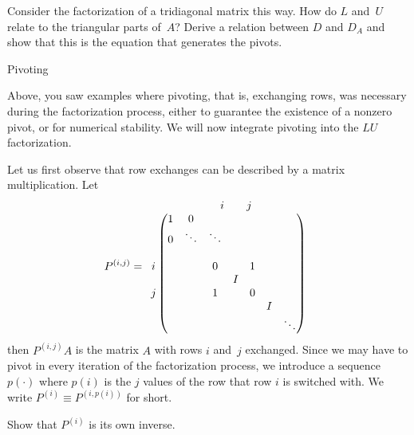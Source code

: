 \begin{exercise}
  Consider the factorization of a tridiagonal matrix this way. How do
  $L$ and~$U$ relate to the triangular parts of~$A$? Derive a relation
  between $D$ and $D_A$ and show that this is the equation that generates
  the pivots.
\end{exercise}

 {Pivoting}
\label{sec:pivoting}

Above, you saw examples where pivoting, that is, exchanging rows, was
necessary during the factorization process, either to guarantee the
existence of a nonzero pivot, or for numerical stability. We will now
integrate pivoting into the $LU$ factorization.

Let us first observe that row exchanges can be described by a matrix
multiplication. Let
\[ P^{(i,j)}=
\begin{array}{cc}
\begin{matrix}\hphantom{i}\end{matrix}
\begin{matrix}&&i&&j&\end{matrix}
\\
\begin{matrix}
  \\ \\ i \\ \\ j\\ \\
\end{matrix}
\begin{pmatrix}
  1&0\\ 0&\ddots&\ddots\\ &\\
  &&0&&1\\ &&&I\\ &&1&&0\\ &&&&&I\\ &&&&&&\ddots
\end{pmatrix}
\end{array}
\]
then $P^{(i,j)}A$ is the matrix $A$ with rows $i$ and~$j$
exchanged. Since we may have to pivot in every iteration of the
factorization process, we introduce a sequence $p(\cdot)$ where $p(i)$
is the $j$ values of the row that row $i$ is switched with. We write
$P^{(i)}\equiv P^{(i,p(i))}$ for short.
\begin{exercise}
  Show that $P^{(i)}$ is its own inverse.
\end{exercise}

